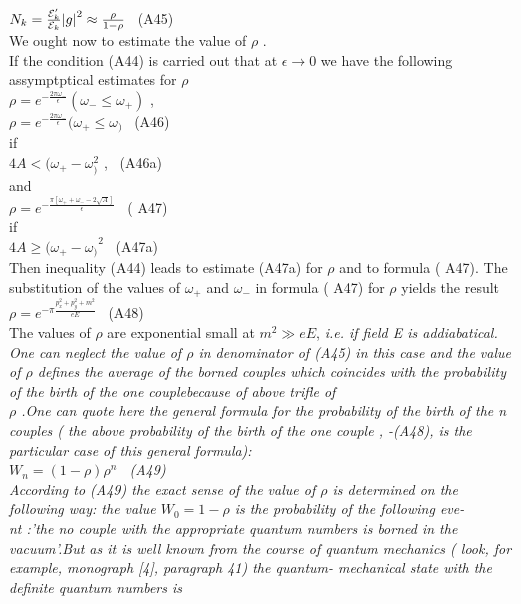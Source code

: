 \documentclass[a4paper,12pt] {article}
\begin{document}
\\ $ N_k = \frac {{\cal E}'_k}{{\cal E}_k} {\vert g \vert}^2 \approx \frac {\rho}{1-\rho} $ \ (A45) \\ We
ought now to estimate the value of $ \rho$ .\\ If the condition (A44) is carried out that at $ \epsilon \to 0 $
 we have the following assymptptical estimates for
 $ \rho$  \\  $ \rho = e^{-\frac {2\pi \omega _-}{\epsilon}}  (\omega _- \le \omega _+)  $ ,
\\ $ \rho =e^{-\frac {2\pi\omega _-}{\epsilon}}  (\omega _+ \le \omega _ ) $ \ (A46)\\ if
\\ $ 4A< ( \omega _+-\omega _ )^2 $ , \ (A46a)\\ and
\\ $ \rho = e^{-\frac {\pi[\omega _++\omega _--2 \sqrt {A}] }{\epsilon}} $  \ ( A47) \\ if
\\ $ 4A \ge {( \omega _+-\omega _ )}^2 $ \ (A47a) \\ Then  inequality (A44) leads to estimate (A47a) for $ \rho$  and to formula ( A47).
The substitution of the values of $\omega _+$ and $\omega _-$ in formula ( A47) for $ \rho$  yields the result
\\ $ \rho= e^{-\pi \frac {p_x^2+ p_y^2 +m ^2}{eE}} $ \ (A48)
\\  The values of $ \rho$  are exponential small at $ m^2 \gg eE $,  \it i.e. if  field \rm E \it is addiabatical. \rm
One can neglect the value of
$ \rho$  in  denominator of  (A45) in this case and the value of $ \rho$ { \it defines the average of the borned couples which coincides with the probability of the
 birth of the one couple}\rm because of above trifle of \\ $ \rho$ .One can quote here the general formula
 for the probability of the birth of  the n couples ( the above
probability of the birth of the one couple , -(A48), is the particular case of this general formula):
 \\ $ W_n =(1- \rho)\rho^n $ \ (A49)\\ According to (A49) the exact sense of the value of $ \rho$ is
determined on the following way: the value $ W_0= 1-\rho $ is the probability of the following eve-\\nt
 :\it 'the no couple with the appropriate quantum numbers is borned in the vacuum'.\rm  But as it is well
 known from the course of quantum mechanics ( look, for example,
monograph [4], paragraph 41) \it the  quantum- mechanical state with the definite quantum numbers is
\end{document}
